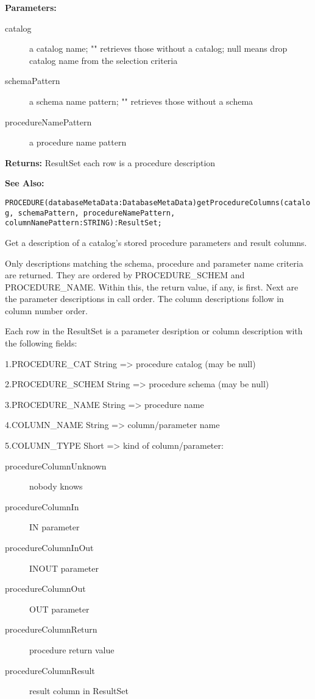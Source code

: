 {\bf Parameters: }
\begin{description}
\item[catalog] a catalog name; "" retrieves those without a catalog; null means drop catalog name from the selection criteria 
\item[schemaPattern] a schema name pattern; "" retrieves those without a schema 
\item[procedureNamePattern] a procedure name pattern 
\end{description}

{\bf Returns: } 
ResultSet each row is a procedure description 

{\bf See Also:} 



\verb'PROCEDURE(databaseMetaData:DatabaseMetaData)getProcedureColumns(catalog, schemaPattern, procedureNamePattern, columnNamePattern:STRING):ResultSet;'





Get a description of a catalog's stored procedure parameters and result columns. 

Only descriptions matching the schema, procedure and parameter name criteria are returned. They are ordered by PROCEDURE\_SCHEM and PROCEDURE\_NAME. Within this, the return value, if any, is first. Next are the parameter descriptions in call order. The column descriptions follow in column number order. 

Each row in the ResultSet is a parameter desription or column description with the following fields: 

1.PROCEDURE\_CAT String => procedure catalog (may be null)

2.PROCEDURE\_SCHEM String => procedure schema (may be null)

3.PROCEDURE\_NAME String => procedure name

4.COLUMN\_NAME String => column/parameter name

5.COLUMN\_TYPE Short => kind of column/parameter: 
\begin{description}
\item[procedureColumnUnknown] nobody knows 
\item[procedureColumnIn] IN parameter 
\item[procedureColumnInOut] INOUT parameter 
\item[procedureColumnOut] OUT parameter 
\item[procedureColumnReturn] procedure return value 
\item[procedureColumnResult] result column in ResultSet 
\end{description}

